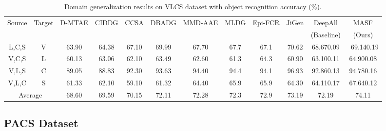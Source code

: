 \documentclass{article}
\newcommand\Tstrut{\rule{0pt}{2.6ex}}         \newcommand\Bstrut{\rule[-0.9ex]{0pt}{0pt}}
\begin{document}
\vspace{-2mm}
\begin{table}[h]
    \centering
    \caption{Domain generalization results on VLCS dataset with object recognition accuracy (\%).}
    \setlength{\tabcolsep}{3pt}
    \begin{adjustbox}{scale=.80}
    \begin{tabular}{cc|cccccccc|cc}
    \toprule
    \multirow{2}{*}{Source}  & \multirow{2}{*}{Target}  & D-MTAE  & CIDDG & CCSA & DBADG  & MMD-AAE & MLDG  & Epi-FCR  & JiGen & DeepAll  & MASF \\
     & & \citep{ghifary2015domain} & \citep{li2018deep}  & \citep{motiian2017unified} & \citep{li2017deeper} & \citep{li2018domain} & \citep{li2018learning}   & \citep{li2019episodic}  & \citep{carlucci2019domain} & (Baseline) & (Ours) \\
    \hline
          {L},{C},{S}    &  V      & 63.90  & 64.38 & 67.10 & 69.99  & 67.70 & 67.7   & 67.1   & 70.62  & 68.670.09  & ~69.140.19  \Tstrut \\
          {V},{C},{S}    &  L      & 60.13  & 63.06 & 62.10 & 63.49  & 62.60 & 61.3   & 64.3   & 60.90  & 63.100.11  & 64.900.08   \\
          {V},{L},{S}    &  C      & 89.05  & 88.83 & 92.30 & 93.63  & 94.40 & 94.4   & 94.1   & 96.93  & 92.860.13  & 94.780.16   \\
          {V},{L},{C}    &  S      & 61.33  & 62.10 & 59.10 & 61.32  & 64.40 & 65.9   & 65.9   & 64.30  & 64.110.17  & 67.640.12   \\
    \hline
\multicolumn{2}{c|}{Average}       & 68.60  & 69.59 & 70.15 & 72.11   & 72.28  & 72.3   & 72.9   & 73.19  & 72.19  & 74.11  \Tstrut \\
    \bottomrule
    \end{tabular}
    \end{adjustbox}
    \label{tab:vlcs}
\end{table}
\vspace{-2mm}


\subsection{PACS Dataset}
\label{sec:exp_pacs}
\end{document}
